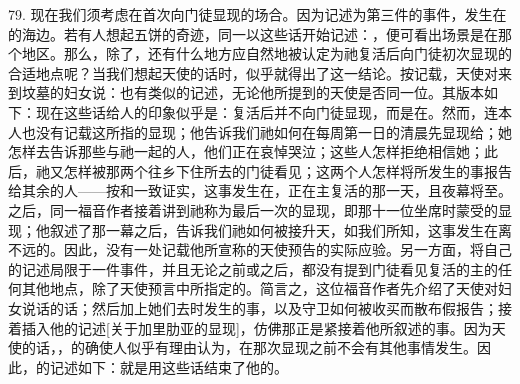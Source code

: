 79. 现在我们须考虑在首次向门徒显现的场合。因为记述为第三件的事件，发生在的海边。若有人想起五饼的奇迹，同一以这些话开始记述：，便可看出场景是在那个地区。那么，除了，还有什么地方应自然地被认定为祂复活后向门徒初次显现的合适地点呢？当我们想起天使的话时，似乎就得出了这一结论。按记载，天使对来到坟墓的妇女说：也有类似的记述，无论他所提到的天使是否同一位。其版本如下：现在这些话给人的印象似乎是：复活后并不向门徒显现，而是在。然而，连本人也没有记载这所指的显现；他告诉我们祂如何在每周第一日的清晨先显现给；她怎样去告诉那些与祂一起的人，他们正在哀悼哭泣；这些人怎样拒绝相信她；此后，祂又怎样被那两个往乡下住所去的门徒看见；这两个人怎样将所发生的事报告给其余的人——按和一致证实，这事发生在，正在主复活的那一天，且夜幕将至。之后，同一福音作者接着讲到祂称为最后一次的显现，即那十一位坐席时蒙受的显现；他叙述了那一幕之后，告诉我们祂如何被接升天，如我们所知，这事发生在离不远的。因此，没有一处记载他所宣称的天使预告的实际应验。另一方面，将自己的记述局限于一件事件，并且无论之前或之后，都没有提到门徒看见复活的主的任何其他地点，除了天使预言中所指定的。简言之，这位福音作者先介绍了天使对妇女说话的话；然后加上她们去时发生的事，以及守卫如何被收买而散布假报告；接着插入他的记述[关于加里肋亚的显现]，仿佛那正是紧接着他所叙述的事。因为天使的话，，的确使人似乎有理由认为，在那次显现之前不会有其他事情发生。因此，的记述如下：就是用这些话结束了他的。\par

